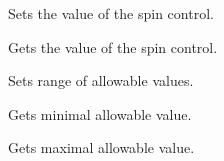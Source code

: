 \label{wxspinctrlsetvalue}



Sets the value of the spin control.

\label{wxspinctrlgetvalue}


Gets the value of the spin control.

\label{wxspinctrlsetrange}


Sets range of allowable values.

\label{wxspinctrlgetmin}


Gets minimal allowable value.

\label{wxspinctrlgetmax}


Gets maximal allowable value.

